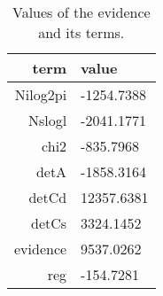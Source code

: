 \begin{table*}\caption{Values of the evidence and its terms.}\begin{center}\begin{tabular}{ r l } term & value \\
\hline Nilog2pi & -1254.7388 \\ 
Nslogl & -2041.1771 \\ 
chi2 & -835.7968 \\ 
detA & -1858.3164 \\ 
detCd & 12357.6381 \\ 
detCs & 3324.1452 \\ 
evidence & 9537.0262 \\ 
reg & -154.7281 \\ 
\hline\end{tabular}\end{center}\label{tab:2}\end{table*}
